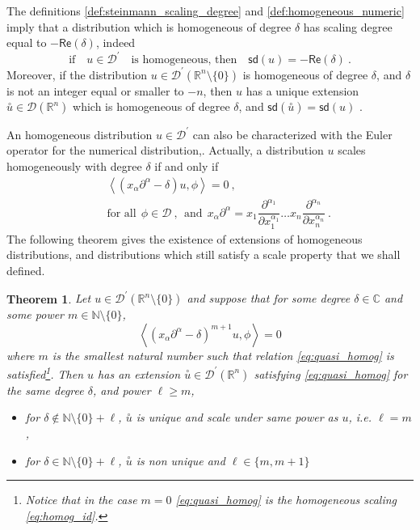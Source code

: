 \documentclass[11pt]{book}
\newcommand{\sd}{\mathsf{sd}}
\renewcommand{\Re}{\mathsf{Re}}
\newcommand{\sm}[1]{\left\langle#1\right\rangle}
\newcommand{\exte}[1]{\overset{\circ}{#1}}
\newcommand{\Dcal}{\mathcal{D}}
\newcommand{\Cbb}{\mathbb{C}}
\newcommand{\Nbb}{\mathbb{N}}
\newcommand{\Rbb}{\mathbb{R}}
\theoremstyle{break}
\newtheorem{theorem}{Theorem}[chapter]
\begin{document}
The definitions \ref{def:steinmann_scaling_degree} and \ref{def:homogeneous_numeric} imply that a distribution which is homogeneous of degree $\delta$ has scaling degree equal to $-\Re(\delta)$, indeed
%
\begin{equation}
\mbox{if} \quad u \in \Dcal^\prime \quad \mbox{is homogeneous, then} \quad \sd(u) = -\Re(\delta) \ .
\end{equation}
%
Moreover, if the distribution $u \in \Dcal^\prime(\Rbb^n\setminus \{0\})$ is homogeneous of degree $\delta$, and $\delta$ is not an integer equal or smaller to $-n$, then $u$ has a unique extension $\exte{u} \in \Dcal(\Rbb^n)$ which is homogeneous of degree $\delta$, and $\sd(\exte{u})=\sd(u)$ \cite{HORMANDER_1990}.


An homogeneous distribution $u \in \Dcal^\prime$ can also be characterized with the Euler operator for the numerical distribution,. Actually, a distribution $u$ scales homogeneously with degree $\delta$ if and only if 
%
\begin{eqnarray*}
&& \sm{\left(x_\alpha \partial^\alpha - \delta \right) u ,\phi} =  0 \ , \\
&& \mbox{for all} \ \ \phi \in \Dcal \ , \ \ \mbox{and} \ \ x_\alpha \partial^\alpha = x_1 \dfrac{\partial^{\alpha_1}}{\partial x_1^{\alpha_1}} \dots x_n \dfrac{\partial^{\alpha_n}}{\partial x_n^{\alpha_n}} \ .
\end{eqnarray*}
%
The following theorem \cite{DFKR_2014} gives the existence of extensions of homogeneous distributions, and distributions which still satisfy a scale property that we shall defined.
%
\begin{theorem}\label{theo:almost_homo_numeric}
Let $u \in \Dcal^\prime(\Rbb^n\setminus\{0\})$ and suppose that for some degree $\delta\in\Cbb$ and some power $m\in\Nbb\setminus\{0\}$, 
%
\begin{equation}
\sm{\left(x_\alpha \partial^\alpha - \delta \right)^{m+1} u , \phi } =  0
\label{eq:quasi_homog}
\end{equation}
%
where $m$ is the smallest natural number such that relation \eqref{eq:quasi_homog} is satisfied\footnote{Notice that in the case $m=0$ \eqref{eq:quasi_homog} is the homogeneous scaling \eqref{eq:homog_id}.}. Then $u$ has an extension $\exte{u}\in\Dcal^\prime(\Rbb^n)$ satisfying \eqref{eq:quasi_homog} for the same degree $\delta$, and power $\ell \geq m$,
%
\begin{itemize}
\item for $\delta \notin \Nbb \setminus \{0\} + \ell$, $\exte{u}$ is unique and scale under same power as $u$, i.e. $\ell=m$,
%
\item for $\delta \in \Nbb \setminus \{0\} + \ell$, $\exte{u}$ is non unique and $\ell\in\{ m , m+1 \}$
\end{itemize}
%
\end{theorem}
\end{document}
